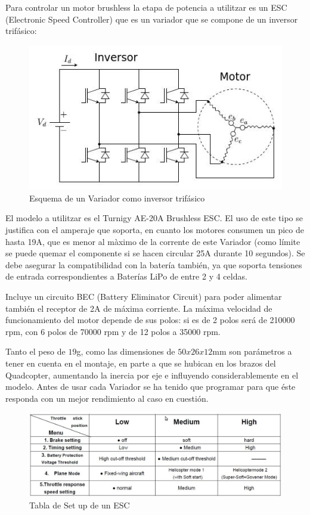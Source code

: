 \documentclass[twoside,11pt]{report}
\begin{document}
Para controlar un motor brushless la etapa de potencia a utilitzar es un ESC (Electronic Speed Controller) que es un  variador que se compone de un inversor trifásico:
\begin{figure}[h!]
\begin{center}
\includegraphics[scale=0.4]{images/ESC.jpeg}
\caption{Esquema de un Variador como inversor trifásico}
\end{center}
\end{figure}
El modelo a utilitzar es el Turnigy AE-20A Brushless ESC. El uso de este tipo se justifica con el amperaje que soporta, en cuanto los motores consumen un pico de hasta 19A, que es menor al màximo de la corrente de este Variador (como límite se puede quemar el componente si se hacen circular 25A durante 10 segundos). 
Se debe asegurar la compatibilidad con la batería también, ya que soporta tensiones de entrada correspondientes a Baterías LiPo de entre 2 y 4 celdas. 

Incluye un circuito BEC (Battery Eliminator Circuit) para poder alimentar también el receptor de 2A de máxima corriente. 
La máxima velocidad de funcionamiento del motor depende de sus polos: si es de 2 polos será de 210000 rpm, con 6 polos de 70000 rpm y de 12 polos a 35000 rpm.


Tanto el peso de $19$g,  como las dimensiones de $50x26x12$mm son parámetros a tener en cuenta en el montaje, en parte a que se hubican en los brazos del Quadcopter, aumentando la inercia por eje e influyendo considerablemente en el modelo. Antes de usar cada Variador se ha tenido que programar para que éste responda con un mejor rendimiento al caso en cuestión.

\begin{figure}[h!]
\begin{center}
\includegraphics[scale=0.45]{images/ESC_config.jpeg}
\caption{Tabla de Set up de un ESC}
\end{center}
\end{figure}
\end{document}

